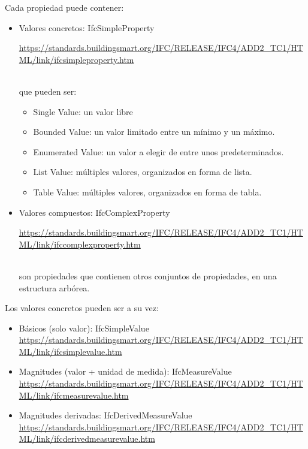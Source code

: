 \documentclass[spanish,10pt,a4paper,final,oneside]{article}
\begin{document}
Cada propiedad puede contener:
\begin{itemize}

\item Valores concretos: IfcSimpleProperty
\\ \begin{footnotesize} \url{https://standards.buildingsmart.org/IFC/RELEASE/IFC4/ADD2_TC1/HTML/link/ifcsimpleproperty.htm}\end{footnotesize}
\\que pueden ser:
\begin{itemize}
\item Single Value: un valor libre
\item Bounded Value: un valor limitado entre un mínimo y un máximo.
\item Enumerated Value: un valor a elegir de entre unos predeterminados.
\item List Value: múltiples valores, organizados en forma de lista.
\item Table Value: múltiples valores, organizados en forma de tabla.
\end{itemize}

\item Valores compuestos: IfcComplexProperty
\\ \begin{footnotesize} \url{https://standards.buildingsmart.org/IFC/RELEASE/IFC4/ADD2_TC1/HTML/link/ifccomplexproperty.htm}\end{footnotesize}
\\son propiedades que contienen otros conjuntos de propiedades, en una estructura arbórea.

\end{itemize}

\vspace{0.5cm}
Los valores concretos pueden ser a su vez:
\begin{itemize}
\item Básicos (solo valor): IfcSimpleValue
\\ \url{https://standards.buildingsmart.org/IFC/RELEASE/IFC4/ADD2_TC1/HTML/link/ifcsimplevalue.htm}
\item Magnitudes (valor + unidad de medida): IfcMeasureValue
\\ \url{https://standards.buildingsmart.org/IFC/RELEASE/IFC4/ADD2_TC1/HTML/link/ifcmeasurevalue.htm}
\item Magnitudes derivadas: IfcDerivedMeasureValue
\\ \url{https://standards.buildingsmart.org/IFC/RELEASE/IFC4/ADD2_TC1/HTML/link/ifcderivedmeasurevalue.htm} 
\end{itemize}
\end{document}
